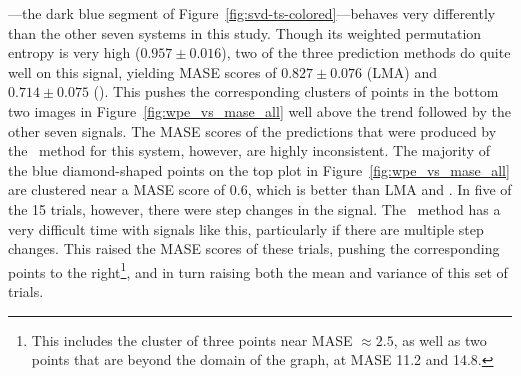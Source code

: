 \svdone---the dark blue segment of
Figure~\ref{fig:svd-ts-colored}---behaves very differently than the
other seven systems in this study.  Though its weighted permutation
entropy is very high ($0.957 \pm 0.016$), two of the three prediction
methods do quite well on this signal, yielding MASE scores of $0.827
\pm 0.076$ (LMA) and $0.714 \pm 0.075$ (\arima).  This pushes the
corresponding clusters of points in the bottom two images in
Figure~\ref{fig:wpe_vs_mase_all} well above the trend followed by the
other seven signals.  The MASE scores of the predictions that were
produced by the \naive ~method for this system, however, are highly
inconsistent.  The majority of the blue diamond-shaped points on the
top plot in Figure~\ref{fig:wpe_vs_mase_all} are clustered near a MASE
score of 0.6, which is better than LMA and \arima.  In five of the
15 \svdone trials, however, there were step changes in the signal.
The \naive ~method has a very difficult time with signals like this,
particularly if there are multiple step changes.  This raised the MASE
scores of these trials, pushing the corresponding points to the
right\footnote{This includes the cluster of three points near MASE
  $\approx 2.5$, as well as two points that are beyond the domain of
  the graph, at MASE 11.2 and 14.8.}, and in turn raising both the
mean and variance of this set of trials.

